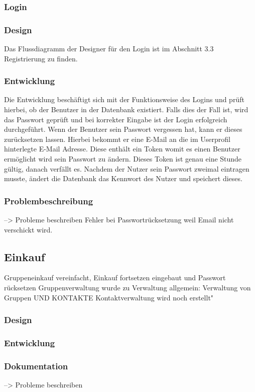\documentclass[12pt,a4paper]{article}
\begin{document}
\subsubsection{Login}
\subsubsection*{Design}
Das Flussdiagramm der Designer für den Login ist im Abschnitt 3.3 Registrierung zu finden. 
\subsubsection*{Entwicklung}
Die Entwicklung beschäftigt sich mit der Funktionsweise des Logins und prüft hierbei, ob der Benutzer in der Datenbank existiert. Falls dies der Fall ist, wird das Passwort geprüft und bei korrekter Eingabe ist der Login erfolgreich durchgeführt.
Wenn der Benutzer sein Passwort vergessen hat, kann er dieses zurücksetzen lassen. Hierbei bekommt er eine E-Mail an die im Userprofil hinterlegte E-Mail Adresse. Diese enthält ein Token womit es einen Benutzer ermöglicht wird sein Passwort zu ändern. Dieses Token ist genau eine Stunde gültig, danach verfällt es. 
Nachdem der Nutzer sein Passwort zweimal eintragen musste, ändert die Datenbank das Kennwort des Nutzer und speichert dieses.
\subsubsection*{Problembeschreibung} --> Probleme beschreiben
Fehler bei Passwortrücksetzung weil Email nicht verschickt wird.
\newpage


\subsection{Einkauf}
Gruppeneinkauf vereinfacht, Einkauf fortsetzen eingebaut und Passwort rücksetzen
Gruppenverwaltung wurde zu Verwaltung allgemein:  Verwaltung von Gruppen UND KONTAKTE 
Kontaktverwaltung wird noch erstellt"
\subsubsection*{Design}
\subsubsection*{Entwicklung}
\subsubsection*{Dokumentation} --> Probleme beschreiben
\newpage
\end{document}
